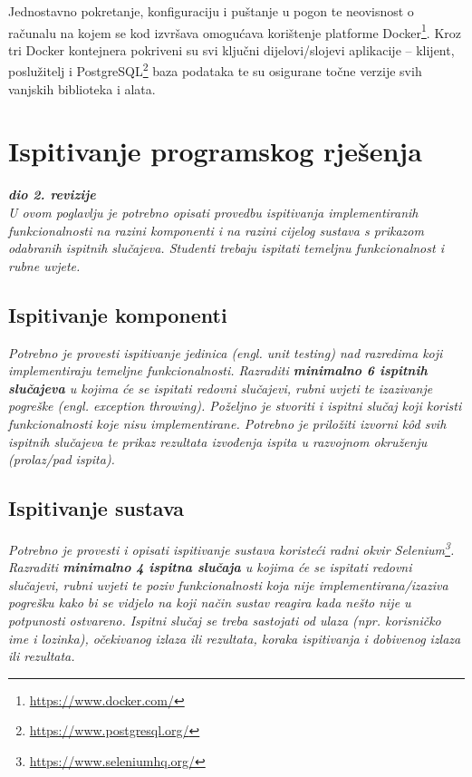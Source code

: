 \noindent Jednostavno pokretanje, konfiguraciju i puštanje u pogon te neovisnost o računalu na kojem se kod izvršava omogućava korištenje platforme Docker\footnote{\url{https://www.docker.com/}}. Kroz tri Docker kontejnera pokriveni su svi ključni dijelovi/slojevi aplikacije – klijent, poslužitelj i PostgreSQL\footnote{\url{https://www.postgresql.org/}} baza podataka te su osigurane točne verzije svih vanjskih biblioteka i alata.
			
			
			\eject 
		
	
		\section{Ispitivanje programskog rješenja}
			
			\textbf{\textit{dio 2. revizije}}\\
			
			 \textit{U ovom poglavlju je potrebno opisati provedbu ispitivanja implementiranih funkcionalnosti na razini komponenti i na razini cijelog sustava s prikazom odabranih ispitnih slučajeva. Studenti trebaju ispitati temeljnu funkcionalnost i rubne uvjete.}
	
			
			\subsection{Ispitivanje komponenti}
			\textit{Potrebno je provesti ispitivanje jedinica (engl. unit testing) nad razredima koji implementiraju temeljne funkcionalnosti. Razraditi \textbf{minimalno 6 ispitnih slučajeva} u kojima će se ispitati redovni slučajevi, rubni uvjeti te izazivanje pogreške (engl. exception throwing). Poželjno je stvoriti i ispitni slučaj koji koristi funkcionalnosti koje nisu implementirane. Potrebno je priložiti izvorni kôd svih ispitnih slučajeva te prikaz rezultata izvođenja ispita u razvojnom okruženju (prolaz/pad ispita). }
			
			
			
			\subsection{Ispitivanje sustava}
			
			 \textit{Potrebno je provesti i opisati ispitivanje sustava koristeći radni okvir Selenium\footnote{\url{https://www.seleniumhq.org/}}. Razraditi \textbf{minimalno 4 ispitna slučaja} u kojima će se ispitati redovni slučajevi, rubni uvjeti te poziv funkcionalnosti koja nije implementirana/izaziva pogrešku kako bi se vidjelo na koji način sustav reagira kada nešto nije u potpunosti ostvareno. Ispitni slučaj se treba sastojati od ulaza (npr. korisničko ime i lozinka), očekivanog izlaza ili rezultata, koraka ispitivanja i dobivenog izlaza ili rezultata.\\ }
			 
